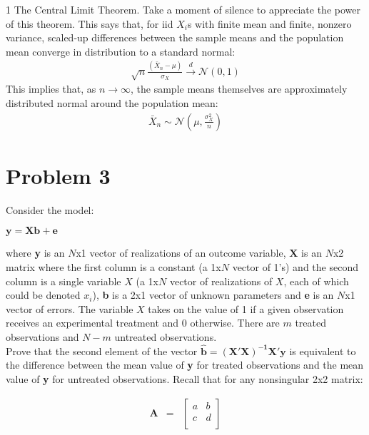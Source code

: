 \documentclass[12pt,letterpaper]{article}
\newcommand{\solutions}{0}
\begin{document}
\begin{enumerate}[(a)]
\if\solutions1
{\color{red}
The Central Limit Theorem. Take a moment of silence to appreciate the power of this theorem. This says that, for iid $X_i$s with finite mean and finite, nonzero variance, scaled-up differences between the sample means and the population mean converge in distribution to a standard normal: 
\begin{align*}
\sqrt{n}\frac{(\bar{X}_{n}-\mu)}{\sigma_X}\overset{d}{\to}\mathcal{N}(0,1)
\end{align*}
This implies that, as $n\to\infty$, the sample means themselves are approximately distributed normal around the population mean:
\begin{align*}
\bar{X}_{n}\sim\mathcal{N}\left(\mu,\frac{\sigma_X^2}{n}\right)
\end{align*}
}
\fi

\end{enumerate}


\section*{Problem 3}
Consider the model:

\begin{center}
$\mathbf{y} =   \mathbf{Xb}  + \mathbf{e}$\\
\end{center}

where \textbf{y} is an $N$x1 vector of realizations of an outcome variable, $\mathbf{X}$ is an $N$x2 matrix where the first column is a constant (a 1x$N$ vector of 1's) and the second column is a single variable $X$ (a 1x$N$ vector of realizations of $X$, each of which could be denoted $x_i$), \textbf{b} is a 2x1 vector of unknown parameters and \textbf{e} is an $N$x1 vector of errors. The variable $X$ takes on the value of 1 if a given observation receives an experimental treatment and 0 otherwise. There are $m$ treated observations and $N-m$ untreated observations. \\


\bigskip
Prove that the second element of the vector $\mathbf{\hat{b}}=\mathbf{(X'X)^{-1}X'y}$ is equivalent to the difference between the mean value of \textbf{y} for treated observations and the mean value of \textbf{y} for untreated observations. 
\bigskip
Recall that for any nonsingular 2x2 matrix:

\begin{eqnarray*}
\mathbf{A} &=& 
\begin{bmatrix} 
a &b\\
c& d\\
\end{bmatrix} 
\end{eqnarray*}
\end{document}
